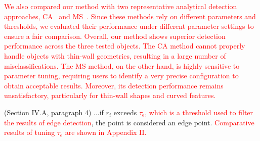 \documentclass[journal]{IEEEtran}
\newcommand{\rev}[1]{\textcolor{red}{#1}}
\begin{document}
\rev{We also compared our method with two representative analytical detection approaches, CA~\cite{bazazian_fast_2015b} and MS~\cite{ahmed2018edge}. Since these methods rely on different parameters and thresholds, we evaluated their performance under different parameter settings to ensure a fair comparison. Overall, our method shows superior detection performance across the three tested objects.
The CA method cannot properly handle objects with thin-wall geometries, resulting in a large number of misclassifications. The MS method, on the other hand, is highly sensitive to parameter tuning, requiring users to identify a very precise configuration to obtain acceptable results. Moreover, its detection performance remains unsatisfactory, particularly for thin-wall shapes and curved features.}



(Section IV.A, paragraph 4) ...if \( r_i \) exceeds \rev{$\tau_\text{e}$, which is a threshold used to filter the results of edge detection}, the point is considered an edge point. \rev{Comparative results of tuning $\tau_\text{e}$ are shown in Appendix II.}
\end{document}
